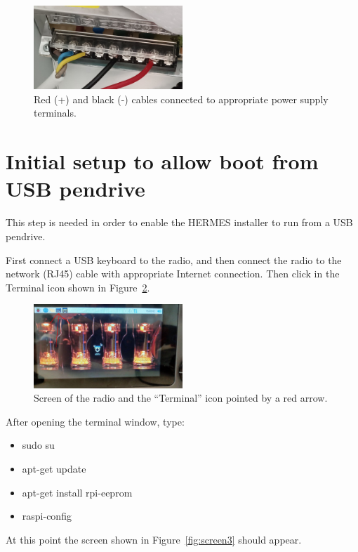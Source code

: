\documentclass[11pt,a4paper]{article}
\begin{document}
\begin{figure}[!ht]
  \centering
  \includegraphics[width=0.5\textwidth]{pictures/psu2.jpeg}
  \caption{Red (+) and black (-) cables connected to appropriate power supply terminals.}
  \label{fig:psu2}
\end{figure}


\section{Initial setup to allow boot from USB pendrive}

This step is needed in order to enable the HERMES installer to run from a USB pendrive.

First connect a USB keyboard to the radio, and then connect the radio to the network (RJ45) cable with appropriate Internet connection.
Then click in the Terminal icon shown in Figure~\ref{fig:terminal}.

\begin{figure}[!ht]
  \centering
  \includegraphics[width=0.5\textwidth]{pictures/screen1-edited.jpeg}
  \caption{Screen of the radio and the ``Terminal'' icon pointed by a red arrow.}
  \label{fig:terminal}
\end{figure}

After opening the terminal window, type:

\begin{itemize}
\item sudo su
\item apt-get update
\item apt-get install rpi-eeprom
\item raspi-config
\end{itemize}

At this point the screen shown in Figure~\ref{fig:screen3} should appear.
\end{document}
